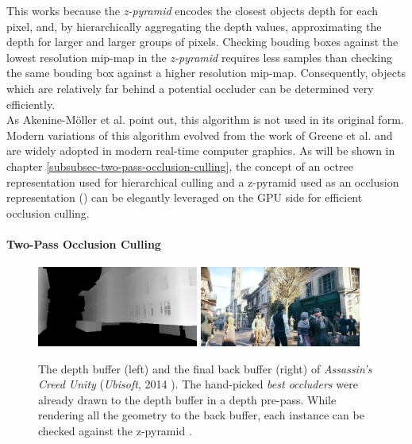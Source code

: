 \noindent
This works because the \emph{z-pyramid} encodes the closest objects depth for each pixel, and, by hierarchically 
aggregating the depth values, approximating the depth for larger and larger groups of pixels. Checking bouding boxes 
against the lowest resolution mip-map in the \emph{z-pyramid} requires less samples than checking the same bouding 
box against a higher resolution mip-map. Consequently, objects which are relatively far behind a potential occluder 
can be determined very efficiently. \\

\noindent 
As Akenine-Möller et al. \cite{AkenineMoeller2018} point out, this algorithm is not used in its original form. 
Modern variations of this algorithm evolved from the work of Greene et al. \cite{Greene93} and are widely adopted in 
modern real-time computer graphics. As will be shown in chapter \ref{subsubsec-two-pass-occlusion-culling}, the concept 
of an octree representation used for hierarchical culling and a z-pyramid used as an occlusion representation 
(\cite{AkenineMoeller2018}) can be elegantly leveraged on the \ac{GPU} side for efficient occlusion culling.


\paragraph*{Two-Pass Occlusion Culling} \label{subsubsec-two-pass-occlusion-culling}

\begin{figure}[h]
    \centering
    \includegraphics[width=200px]{images/graphics/depth-buffer-ac-unity.jpg}
    \includegraphics[width=200px]{images/graphics/final-frame-ac-unity.jpg}
    \caption{The depth buffer (left) and the final back buffer (right) of \emph{Assassin's Creed Unity} (\emph{Ubisoft}, 2014 \cite{Ubisoft2014}). 
    The hand-picked \emph{best occluders} were already drawn to the depth buffer in a depth pre-pass.
    While rendering all the geometry to the back buffer, each instance can be checked against the z-pyramid \cite{Kruskonja2022}.}
    \label{fig:depth-buffer-ac-unity}
\end{figure}

